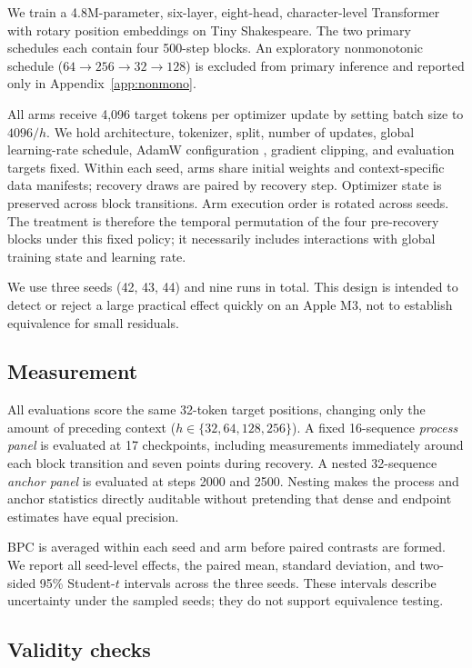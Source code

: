 \documentclass{article}
\begin{document}
We train a 4.8M-parameter, six-layer, eight-head, character-level Transformer with rotary position embeddings \citep{vaswani2017attention,su2021roformer} on Tiny Shakespeare. The two primary schedules each contain four 500-step blocks. An exploratory nonmonotonic schedule ($64{\rightarrow}256{\rightarrow}32{\rightarrow}128$) is excluded from primary inference and reported only in Appendix~\ref{app:nonmono}.

All arms receive 4,096 target tokens per optimizer update by setting batch size to $4096/h$. We hold architecture, tokenizer, split, number of updates, global learning-rate schedule, AdamW configuration \citep{loshchilov2019adamw}, gradient clipping, and evaluation targets fixed. Within each seed, arms share initial weights and context-specific data manifests; recovery draws are paired by recovery step. Optimizer state is preserved across block transitions. Arm execution order is rotated across seeds. The treatment is therefore the temporal permutation of the four pre-recovery blocks under this fixed policy; it necessarily includes interactions with global training state and learning rate.

We use three seeds (42, 43, 44) and nine runs in total. This design is intended to detect or reject a large practical effect quickly on an Apple M3, not to establish equivalence for small residuals.

\subsection{Measurement}

All evaluations score the same 32-token target positions, changing only the amount of preceding context ($h\in\{32,64,128,256\}$). A fixed 16-sequence \emph{process panel} is evaluated at 17 checkpoints, including measurements immediately around each block transition and seven points during recovery. A nested 32-sequence \emph{anchor panel} is evaluated at steps 2000 and 2500. Nesting makes the process and anchor statistics directly auditable without pretending that dense and endpoint estimates have equal precision.

BPC is averaged within each seed and arm before paired contrasts are formed. We report all seed-level effects, the paired mean, standard deviation, and two-sided 95\% Student-$t$ intervals across the three seeds. These intervals describe uncertainty under the sampled seeds; they do not support equivalence testing.

\subsection{Validity checks}
\end{document}
